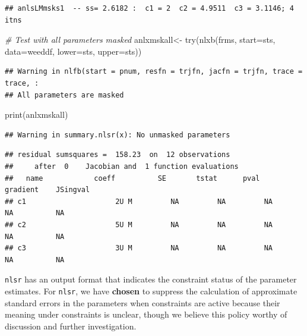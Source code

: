 \documentclass[
]{article}
\newenvironment{Shaded}{\begin{snugshade}}{\end{snugshade}}
\newcommand{\AttributeTok}[1]{\textcolor[rgb]{0.77,0.63,0.00}{#1}}
\newcommand{\CommentTok}[1]{\textcolor[rgb]{0.56,0.35,0.01}{\textit{#1}}}
\newcommand{\FunctionTok}[1]{\textcolor[rgb]{0.00,0.00,0.00}{#1}}
\newcommand{\NormalTok}[1]{#1}
\newcommand{\OtherTok}[1]{\textcolor[rgb]{0.56,0.35,0.01}{#1}}
\begin{document}
\begin{verbatim}
## anlsLMmsks1  -- ss= 2.6182 :  c1 = 2  c2 = 4.9511  c3 = 3.1146; 4  itns
\end{verbatim}

\begin{Shaded}
\begin{Highlighting}[]
\CommentTok{\# Test with all parameters masked}
\NormalTok{anlxmskall}\OtherTok{\textless{}{-}} \FunctionTok{try}\NormalTok{(}\FunctionTok{nlxb}\NormalTok{(frms, }\AttributeTok{start=}\NormalTok{sts, }\AttributeTok{data=}\NormalTok{weeddf, }\AttributeTok{lower=}\NormalTok{sts, }\AttributeTok{upper=}\NormalTok{sts))}
\end{Highlighting}
\end{Shaded}

\begin{verbatim}
## Warning in nlfb(start = pnum, resfn = trjfn, jacfn = trjfn, trace = trace, :
## All parameters are masked
\end{verbatim}

\begin{Shaded}
\begin{Highlighting}[]
\FunctionTok{print}\NormalTok{(anlxmskall)}
\end{Highlighting}
\end{Shaded}

\begin{verbatim}
## Warning in summary.nlsr(x): No unmasked parameters
\end{verbatim}

\begin{verbatim}
## residual sumsquares =  158.23  on  12 observations
##     after  0    Jacobian and  1 function evaluations
##   name            coeff          SE       tstat      pval      gradient    JSingval   
## c1                     2U M         NA         NA         NA          NA          NA  
## c2                     5U M         NA         NA         NA          NA          NA  
## c3                     3U M         NA         NA         NA          NA          NA
\end{verbatim}

\texttt{nlsr} has an output format that indicates the constraint status
of the parameter estimates. For \texttt{nlsr}, we have \textbf{chosen}
to suppress the calculation of approximate standard errors in the
parameters when constraints are active because their meaning under
constraints is unclear, though we believe this policy worthy of
discussion and further investigation.
\end{document}

